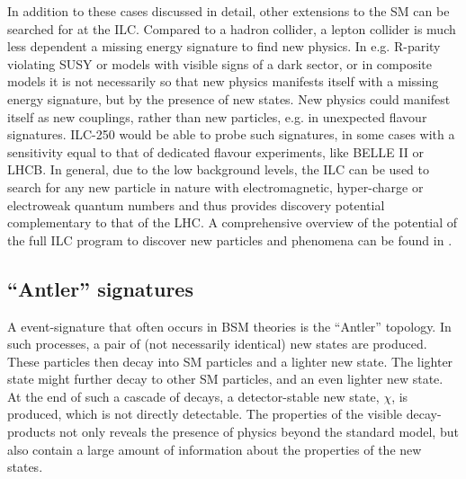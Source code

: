 In addition to these cases discussed in detail,
other extensions to the SM can be searched for at the ILC.
Compared to a hadron collider, a lepton collider is much less dependent 
a  missing energy signature to find new physics.
In e.g. R-parity violating SUSY 
or models with visible signs of a dark sector, or in composite models
it is not necessarily so that new physics manifests itself
with a  missing energy signature, but by the presence of
new states.
New physics could manifest itself as 
new couplings, rather than new particles, e.g. in unexpected
flavour signatures. 
ILC-250 would be able to probe such signatures,
in some cases with a sensitivity
equal to that of dedicated flavour experiments, like BELLE II 
or LHCB.
In general, due to the low background levels, 
the ILC can be used to search for any
new particle in nature with electromagnetic, hyper-charge or
electroweak quantum numbers and thus provides discovery potential
complementary to that of the LHC.
A comprehensive overview of the potential of
the full ILC program  to discover new particles and phenomena 
can be found in \cite{Fujii:2017ekh}.


\subsection{``Antler'' signatures}
\label{subsec:searches_antlers}

A event-signature that often occurs in BSM theories is the
``Antler'' topology.
In such processes,
a pair of (not necessarily identical) new states are produced.
These particles then decay into SM particles and a lighter
new state. 
The lighter state might further decay to other SM particles,
and an even lighter new state.
At the end of such a cascade of decays,
a detector-stable new state,  $\chi$, is produced, 
which is not directly detectable.
The properties of the visible decay-products not only reveals the
presence of physics beyond the standard model, 
but also contain a large amount of information about the properties
of the new states.


